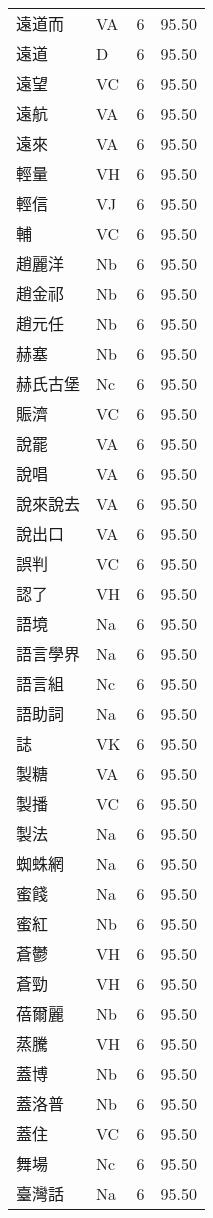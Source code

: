 \documentclass[twocolumn]{book}
\begin{document}
\begin{supertabular}{llrr}
遠道而 & VA & 6 &  95.50\\
遠道 & D & 6 &  95.50\\
遠望 & VC & 6 &  95.50\\
遠航 & VA & 6 &  95.50\\
遠來 & VA & 6 &  95.50\\
輕量 & VH & 6 &  95.50\\
輕信 & VJ & 6 &  95.50\\
輔 & VC & 6 &  95.50\\
趙麗洋 & Nb & 6 &  95.50\\
趙金祁 & Nb & 6 &  95.50\\
趙元任 & Nb & 6 &  95.50\\
赫塞 & Nb & 6 &  95.50\\
赫氏古堡 & Nc & 6 &  95.50\\
賑濟 & VC & 6 &  95.50\\
說罷 & VA & 6 &  95.50\\
說唱 & VA & 6 &  95.50\\
說來說去 & VA & 6 &  95.50\\
說出口 & VA & 6 &  95.50\\
誤判 & VC & 6 &  95.50\\
認了 & VH & 6 &  95.50\\
語境 & Na & 6 &  95.50\\
語言學界 & Na & 6 &  95.50\\
語言組 & Nc & 6 &  95.50\\
語助詞 & Na & 6 &  95.50\\
誌 & VK & 6 &  95.50\\
製糖 & VA & 6 &  95.50\\
製播 & VC & 6 &  95.50\\
製法 & Na & 6 &  95.50\\
蜘蛛網 & Na & 6 &  95.50\\
蜜餞 & Na & 6 &  95.50\\
蜜紅 & Nb & 6 &  95.50\\
蒼鬱 & VH & 6 &  95.50\\
蒼勁 & VH & 6 &  95.50\\
蓓爾麗 & Nb & 6 &  95.50\\
蒸騰 & VH & 6 &  95.50\\
蓋博 & Nb & 6 &  95.50\\
蓋洛普 & Nb & 6 &  95.50\\
蓋住 & VC & 6 &  95.50\\
舞場 & Nc & 6 &  95.50\\
臺灣話 & Na & 6 &  95.50\\

\end{supertabular}
\end{document}
